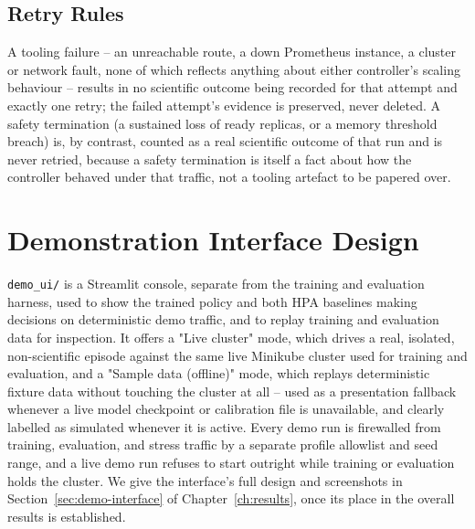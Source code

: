 \begin{table}[H]
\centering
\caption[Pre-registered decision rule]{Pre-registered decision rule (CORR-60).}
\label{tab:decision-rule}
\small

\end{table}

\subsection{Retry Rules}

A tooling failure -- an unreachable route, a down Prometheus instance, a
cluster or network fault, none of which reflects anything about either
controller's scaling behaviour -- results in no scientific outcome being
recorded for that attempt and exactly one retry; the failed attempt's
evidence is preserved, never deleted. A safety termination (a sustained
loss of ready replicas, or a memory threshold breach) is, by contrast,
counted as a real scientific outcome of that run and is never retried,
because a safety termination is itself a fact about how the controller
behaved under that traffic, not a tooling artefact to be papered over.

\section{Demonstration Interface Design}
\label{sec:demo-ui-design}

\texttt{demo\_\allowbreak ui/\allowbreak \allowbreak } is a Streamlit console, separate from the training and
evaluation harness, used to show the trained policy and both HPA baselines
making decisions on deterministic demo traffic, and to replay training and
evaluation data for inspection. It offers a "Live cluster" mode, which
drives a real, isolated, non-scientific episode against the same live
Minikube cluster used for training and evaluation, and a "Sample data
(offline)" mode, which replays deterministic fixture data without touching
the cluster at all -- used as a presentation fallback whenever a live model
checkpoint or calibration file is unavailable, and clearly labelled as
simulated whenever it is active. Every demo run is firewalled from
training, evaluation, and stress traffic by a separate profile allowlist
and seed range, and a live demo run refuses to start outright while
training or evaluation holds the cluster. We give the interface's full
design and screenshots in Section~\ref{sec:demo-interface} of
Chapter~\ref{ch:results}, once its place in the overall results is
established.

